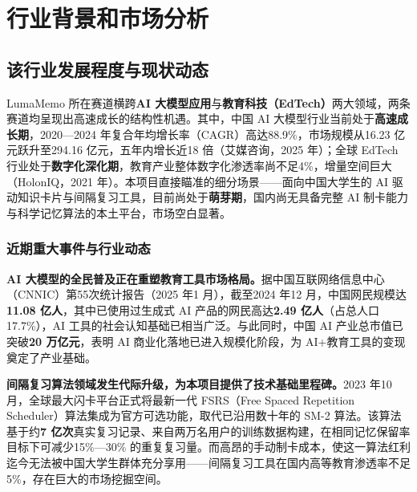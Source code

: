 ﻿%

\chapter{行业背景和市场分析}

\section{该行业发展程度与现状动态}

LumaMemo 所在赛道横跨\textbf{AI 大模型应用}与\textbf{教育科技（EdTech）}两大领域，两条赛道均呈现出高速成长的结构性机遇。其中，中国 AI 大模型行业当前处于\textbf{高速成长期}，2020—2024 年复合年均增长率（CAGR）高达88.9\%，市场规模从16.23 亿元跃升至294.16 亿元，五年内增长近18 倍（艾媒咨询，2025 年）；全球 EdTech 行业处于\textbf{数字化深化期}，教育产业整体数字化渗透率尚不足4\%，增量空间巨大（HolonIQ，2021 年）。本项目直接瞄准的细分场景——面向中国大学生的 AI 驱动知识卡片与间隔复习工具，目前尚处于\textbf{萌芽期}，国内尚无具备完整 AI 制卡能力与科学记忆算法的本土平台，市场空白显著。

\subsection{近期重大事件与行业动态}

\textbf{AI 大模型的全民普及正在重塑教育工具市场格局。}据中国互联网络信息中心（CNNIC）第55次统计报告（2025 年1 月），截至2024 年12 月，中国网民规模达\textbf{11.08 亿人}，其中已使用过生成式 AI 产品的网民高达\textbf{2.49 亿人}（占总人口17.7\%），AI 工具的社会认知基础已相当广泛。与此同时，中国 AI 产业总市值已突破\textbf{20 万亿元}，表明 AI 商业化落地已进入规模化阶段，为 AI+教育工具的变现奠定了产业基础。

\textbf{间隔复习算法领域发生代际升级，为本项目提供了技术基础里程碑。}2023 年10 月，全球最大闪卡平台正式将最新一代 FSRS（Free Spaced Repetition Scheduler）算法集成为官方可选功能，取代已沿用数十年的 SM-2 算法。该算法基于约\textbf{7 亿次}真实复习记录、来自两万名用户的训练数据构建，在相同记忆保留率目标下可减少15\%—30\% 的重复复习量。而高昂的手动制卡成本，使这一算法红利迄今无法被中国大学生群体充分享用——间隔复习工具在国内高等教育渗透率不足5\%，存在巨大的市场挖掘空间。


